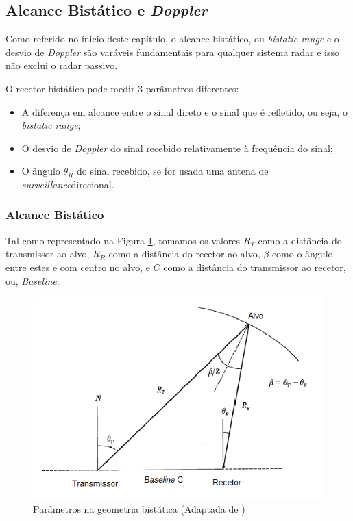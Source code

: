 \subsection{Alcance Bistático e \textit{Doppler}}
Como referido no ínicio deste capítulo, o alcance bistático, ou \textit{bistatic range} e o desvio de \textit{Doppler} são varáveis fundamentais para qualquer sistema radar e isso não exclui o radar passivo.\par 
O recetor bistático pode medir 3 parâmetros diferentes:
\begin{itemize}
\item A diferença em alcance entre o sinal direto e o sinal que é refletido, ou seja, o \textit{bistatic range};
\item O desvio de \textit{Doppler} do sinal recebido relativamente à frequência do sinal;
\item O ângulo $\theta_{R}$ do sinal recebido, se for usada uma antena de \textit{surveillance}direcional.
\end{itemize}

\subsubsection*{Alcance Bistático} \label{subchapter:alcance_bistatico}
Tal como representado na Figura \ref{fig:geom}, tomamos os valores $R_{T}$ como a distância do transmissor ao alvo,  $R_{R}$ como a distância do recetor ao alvo,  $\beta$ como o ângulo entre estes e com centro no alvo, e  $C$ como a distância do transmissor ao recetor, ou, \textit{Baseline}.\par


\begin{figure}[h]
\centering
\includegraphics[scale=0.9]{chapters/ch2/assets/geom}
\caption[Parâmetros na geometria bistática]{Parâmetros na geometria bistática (Adaptada de \cite{GRIFFITHS2014813})}
\label{fig:geom}
\end{figure}


